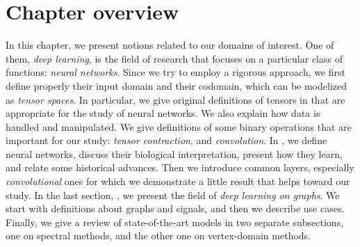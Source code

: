 \section*{Chapter overview}

In this chapter, we present notions related to our domains of interest. One of them, \emph{deep learning}, is the field of research that focuses on a particular class of functions: \emph{neural networks}. Since we try to employ a rigorous approach, we first define properly their input domain and their codomain, which can be modelized as \emph{tensor spaces}. In particular, we give original definitions of tensors in  that are appropriate for the study of neural networks. We also explain how data is handled and manipulated. We give definitions of some binary operations that are important for our study: \emph{tensor contraction}, and \emph{convolution}. In , we define neural networks, discuss their biological interpretation, present how they learn, and relate some historical advances. Then we introduce common layers, especially \emph{convolutional} ones for which we demonstrate a little result that helps toward our study. In the last section, , we present the field of \emph{deep learning on graphs}. We start with definitions about graphs and signals, and then we describe use cases. Finally, we give a review of state-of-the-art models in two separate subsections, one on spectral methods, and the other one on vertex-domain methods.